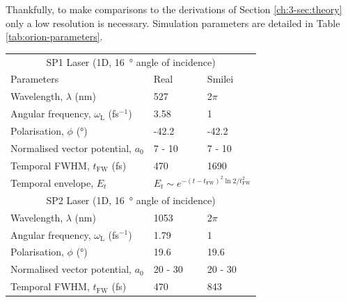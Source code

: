 Thankfully, to make comparisons to the derivations of Section \ref{ch:3-sec:theory} only a low resolution is necessary. Simulation parameters are detailed in Table \ref{tab:orion-parameters}. 
\begin{table}[]
	\begin{center}
		\begin{tabular}{lll}
			\hline \hline
			\multicolumn{3}{c}{SP1 Laser (1D, \qty{16}{\degree} angle of incidence)}   \\
			Parameters                                        & Real                                 & Smilei                         \\ \hline
			Wavelength, $\lambda$ (nm)                        & 527                                 & 2$\pi$                      \\
			Angular frequency, $\omega_\mathrm{L}$ (fs$^{-1}$)         & 3.58                                  & 1                           \\
			Polarisation, $\phi$ (\unit{\degree})        & -42.2                                 &    -42.2                         \\
			Normalised vector potential, $a_0$     & 7 - 10                               &    7 - 10                           \\
			Temporal FWHM, $t_\mathrm{FW}$ (fs)       & 470                                 &      1690                    \\
			Temporal envelope, $E_t$                          & \multicolumn{2}{l}{$E_t \sim e^{-(t-t_\mathrm{FW})^2\ln 2 /t_\mathrm{FW}^2}$} \vspace{0.15cm}\\ \hline \hline
			\multicolumn{3}{c}{SP2 Laser (1D, \qty{16}{\degree} angle of incidence)}      \\ \hline
			Wavelength, $\lambda$ (nm)                        & 1053                                 & 2$\pi$                      \\
			Angular frequency, $\omega_\mathrm{L}$ (fs$^{-1}$)         & 1.79                                  & 1                           \\
			Polarisation, $\phi$ (\unit{\degree})          &        19.6                           &     19.6                        \\
			Normalised vector potential, $a_0$     & 20 - 30                               &    20 - 30                        \\
			Temporal FWHM, $t_\mathrm{FW}$ (fs)       & 470                                 &      843                    \\

\end{tabular}
\end{center}
\end{table}
